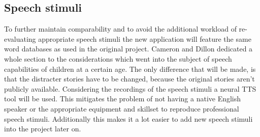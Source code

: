 \documentclass[a4paper,11pt]{article}%
\renewcommand{\\}{\vspace*{0.5\baselineskip} \newline}
\begin{document}
\subsection{Speech stimuli}
\label{sec:speech}
To further maintain comparability and to avoid the additional workload of re-evaluating appropriate speech stimuli the new application will feature the same word databases as used in the original project. Cameron and Dillon dedicated a whole section to the considerations which went into the subject of speech capabilities of children at a certain age. The only difference that will be made, is that the distracter stories have to be changed, because the original stories aren't publicly available.
\newline
\newline
Considering the recordings of the speech stimuli a neural \ac{TTS} tool will be used. This mitigates the problem of not having a native English speaker or the appropriate equipment and skillset to reproduce professional speech stimuli. Additionally this makes it a lot easier to add new speech stimuli into the project later on.


\end{document}
